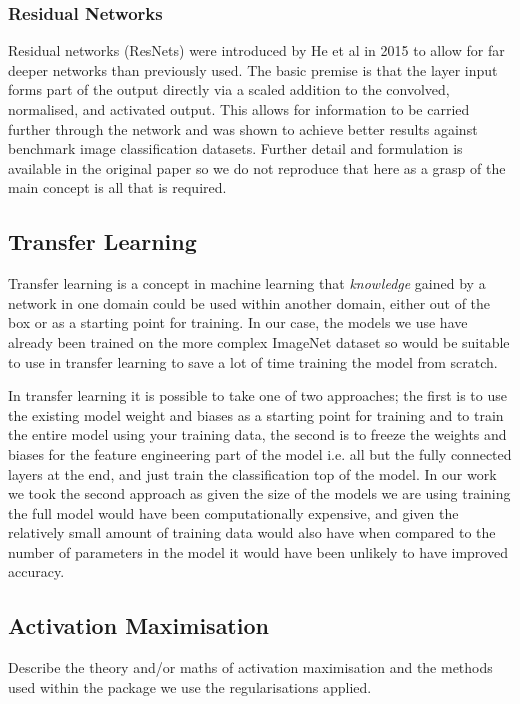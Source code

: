 \documentclass[12pt]{article}
\numberwithin{equation}{section}
\numberwithin{figure}{section}
\begin{document}
\subsubsection{Residual Networks}
Residual networks (ResNets) were introduced by He et al in 2015\cite{He2015a} to allow for far deeper networks than previously used. The basic premise is that the layer input forms part of the output directly via a scaled addition to the convolved, normalised, and activated output. This allows for information to be carried further through the network and was shown to achieve better results against benchmark image classification datasets. Further detail and formulation is available in the original paper so we do not reproduce that here as a grasp of the main concept is all that is required.

\subsection{Transfer Learning} 
\label{sub:Transfer_Learning} 
Transfer learning is a concept in machine learning that \emph{knowledge} gained by a network in one domain could be used within another domain, either out of the box or as a starting point for training. In our case, the models we use have already been trained on the more complex ImageNet dataset so would be suitable to use in transfer learning to save a lot of time training the model from scratch.


In transfer learning it is possible to take one of two approaches; the first is to use the existing model weight and biases as a starting point for training and to train the entire model using your training data, the second is to freeze the weights and biases for the feature engineering part of the model i.e. all but the fully connected layers at the end, and just train the classification top of the model. In our work we took the second approach as given the size of the models we are using training the full model would have been computationally expensive, and given the relatively small amount of training data would also have when compared to the number of parameters in the model it would have been unlikely to have improved accuracy.

\subsection{Activation Maximisation} 
\label{sub:Activation_Maximisation} 
Describe the theory and/or maths of activation maximisation and the methods used within the package we use the regularisations applied. 
\end{document}
